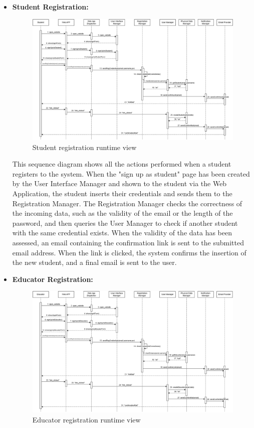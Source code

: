  \begin{itemize}
    \item \textbf{Student Registration:}

    \begin{figure}[H]
        \centering
        \includegraphics[width=1\linewidth]{Images/RV1.png}
        \caption{Student registration runtime view}
        \label{fig:rv1}
    \end{figure}

    This sequence diagram shows all the actions performed when a student registers to the system. When the "sign up as student" page has been created by the User Interface Manager and shown to the student via the Web Application, the student inserts their credentials and sends them to the Registration Manager. The Registration Manager checks the correctness of the incoming data, such as the validity of the email or the length of the password, and then queries the User Manager to check if another student with the same credential exists. When the validity of the data has been assessed, an email containing the confirmation link is sent to the submitted email address. When the link is clicked, the system confirms the insertion of the new student, and a final email is sent to the user.

    \item \textbf{Educator Registration:}

    \begin{figure}[H]
        \centering
        \includegraphics[width=1\linewidth]{Images/RV2.png}
        \caption{Educator registration runtime view}
        \label{fig:rv2}
    \end{figure}


\end{itemize}
